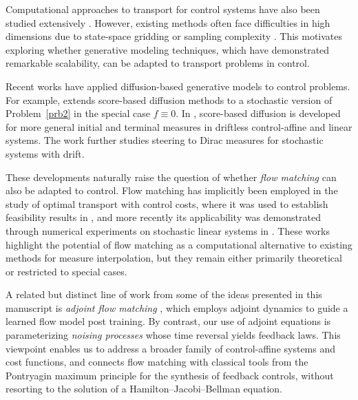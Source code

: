 \documentclass{article}
\begin{document}
Computational approaches to transport for control systems have also been studied extensively \cite{elamvazhuthi2018optimal,elamvazhuthi2023dynamical,ito2023entropic,wu2024duality,craig2025blob,elamvazhuthi2025optimal}. However, existing methods often face difficulties in high dimensions due to state-space gridding \cite{elamvazhuthi2018optimal,elamvazhuthi2023dynamical} or sampling complexity \cite{craig2025blob}. This motivates exploring whether generative modeling techniques, which have demonstrated remarkable scalability, can be adapted to transport problems in control. 



Recent works have applied diffusion-based generative models to control problems. For example, \cite{grong2024score} extends score-based diffusion methods to a stochastic version of Problem~\ref{prb2} in the special case $f \equiv 0$. In \cite{elamvazhuthi2025score}, score-based diffusion is developed for more general initial and terminal measures in driftless control-affine and linear systems. The work \cite{mei2025time} further studies steering to Dirac measures for stochastic systems with drift. 

These developments naturally raise the question of whether \emph{flow matching} \cite{lipmanflow,liu2022flow,albergo2023stochastic} can also be adapted to control. Flow matching has implicitly been employed in the study of optimal transport with control costs, where it was used to establish feasibility results in \cite{elamvazhuthi2024benamou}, and more recently its applicability was demonstrated through numerical experiments on stochastic linear systems in \cite{mei2025flow}. These works highlight the potential of flow matching as a computational alternative to existing methods for measure interpolation, but they remain either primarily theoretical or restricted to special cases.

A related but distinct line of work from some of the ideas presented in this manuscript is \emph{adjoint flow matching} \cite{domingo2024adjoint}, which employs adjoint dynamics to guide a learned flow model post training. By contrast, our use of adjoint equations is parameterizing \emph{noising processes} whose time reversal yields feedback laws. This viewpoint enables us to address a broader family of control-affine systems and cost functions, and connects flow matching with classical tools from the Pontryagin maximum principle for the synthesis of feedback controls, without resorting to the solution of a Hamilton–Jacobi–Bellman equation.
\end{document}
